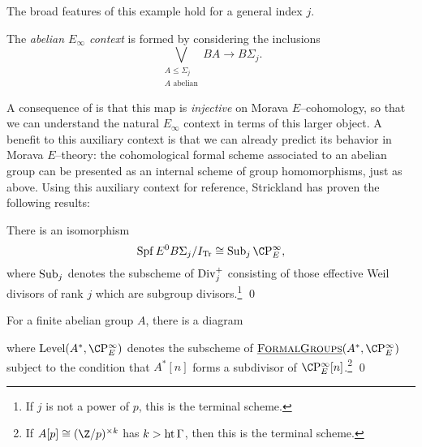 The broad features of this example hold for a general index $j$.
\begin{definition}
The \textit{abelian $E_\infty$ context} is formed by considering the inclusions \[\bigvee_{\substack{A \le \Sigma_j \\ \text{$A$ abelian}}} BA \to B\Sigma_j.\]
\end{definition}
\noindent A consequence of  is that this map is \emph{injective} on Morava $E$--cohomology, so that we can understand the natural $E_\infty$ context in terms of this larger object.  A benefit to this auxiliary context is that we can already predict its behavior in Morava $E$--theory: the cohomological formal scheme associated to an abelian group can be presented as an internal scheme of group homomorphisms, just as above.  Using this auxiliary context for reference, Strickland has proven the following results:

\begin{theorem}
There is an isomorphism \[\Spf E^0 B\Sigma_j / I_{\Tr} \cong \Sub_j \CP^\infty_E,\] where $\operatorname{Sub}_j$ denotes the subscheme of $\operatorname{Div}_j^+$ consisting of those effective Weil divisors of rank $j$ which are subgroup divisors.\footnote{If $j$ is not a power of $p$, this is the terminal scheme.} \qed
\end{theorem}

\begin{theorem}
For a finite abelian group $A$, there is a diagram
\begin{center}
\end{center}
where $\Level(A^*, \CP^\infty_E)$ denotes the subscheme of $\InternalHom{FormalGroups}(A^*, \CP^\infty_E)$ subject to the condition that $A^*[n]$ forms a subdivisor of $\CP^\infty_E[n]$.\footnote{If $A[p] \cong (\Z/p)^{\times k}$ has $k > \operatorname{ht}{\Gamma}$, then this is the terminal scheme.} \qed
\end{theorem}

